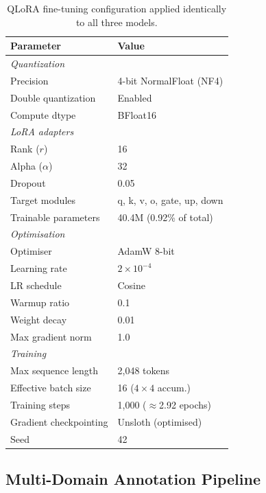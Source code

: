 \documentclass[runningheads]{llncs}
\begin{document}
\begin{table}[t]
\centering
\caption{QLoRA fine-tuning configuration applied identically to all three models.}
\label{tab:qlora_config}
\begin{tabular}{ll}
\toprule
\textbf{Parameter} & \textbf{Value} \\
\midrule
\multicolumn{2}{l}{\textit{Quantization}} \\
\quad Precision & 4-bit NormalFloat (NF4) \\
\quad Double quantization & Enabled \\
\quad Compute dtype & BFloat16 \\
\midrule
\multicolumn{2}{l}{\textit{LoRA adapters}} \\
\quad Rank ($r$) & 16 \\
\quad Alpha ($\alpha$) & 32 \\
\quad Dropout & 0.05 \\
\quad Target modules & q, k, v, o, gate, up, down \\
\quad Trainable parameters & 40.4M (0.92\% of total) \\
\midrule
\multicolumn{2}{l}{\textit{Optimisation}} \\
\quad Optimiser & AdamW 8-bit \\
\quad Learning rate & $2{\times}10^{-4}$ \\
\quad LR schedule & Cosine \\
\quad Warmup ratio & 0.1 \\
\quad Weight decay & 0.01 \\
\quad Max gradient norm & 1.0 \\
\midrule
\multicolumn{2}{l}{\textit{Training}} \\
\quad Max sequence length & 2{,}048 tokens \\
\quad Effective batch size & 16 ($4 \times 4$ accum.) \\
\quad Training steps & 1{,}000 ($\approx$2.92 epochs) \\
\quad Gradient checkpointing & Unsloth (optimised) \\
\quad Seed & 42 \\
\bottomrule
\end{tabular}
\end{table}

\subsection{Multi-Domain Annotation Pipeline}
\label{sec:meth_pipeline}
\end{document}
